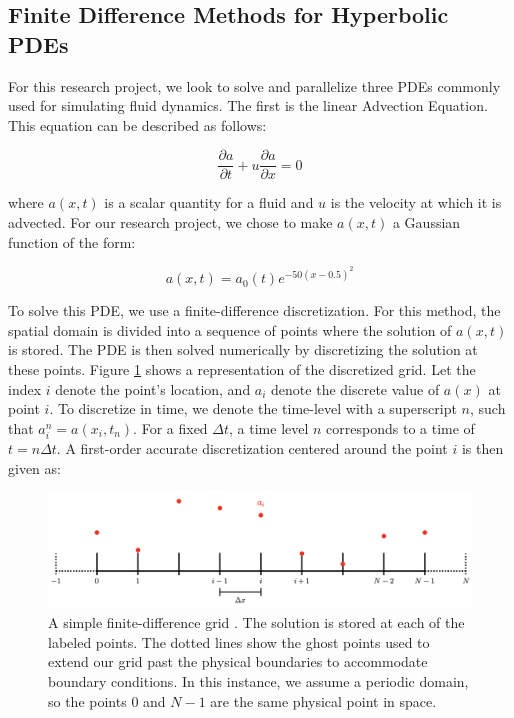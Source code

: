 \documentclass{article}
\begin{document}
\subsection{Finite Difference Methods for Hyperbolic PDEs}
For this research project, we look to solve and parallelize three PDEs commonly used for simulating fluid dynamics. The first is the linear Advection Equation. This equation can be described as follows: 

\begin{equation}
 \frac{\partial a}{\partial t} + u \frac{\partial a}{\partial x} = 0
\end{equation}

where $a(x,t)$ is a scalar quantity for a fluid and $u$ is the velocity at which it is advected. For our research project, we chose to make $a(x,t)$ a Gaussian function of the form: 

\begin{equation}
a(x,t) = a_0(t) e^{- 50 (x - 0.5)^2 }
\end{equation}

To solve this PDE, we use a finite-difference discretization. For this method, the spatial domain is divided into a sequence of points where the solution of $a(x,t)$ is stored. The PDE is then solved numerically by discretizing the solution at these points. Figure \ref{Finite_Difference_Grid} shows a representation of the discretized grid.
Let the index $i$ denote the point's location, and $a_i$ denote the discrete value of $a(x)$ at point $i$. To discretize in time, we denote the time-level with a superscript $n$, such that $a_i^n = a(x_i, t_n)$. For a fixed $\Delta t$, a time level $n$ corresponds to a time of $t = n \Delta t$. A first-order accurate discretization centered around the point $i$ is then given as:


\begin{figure}[b]
\centering
\includegraphics[width=1.0\textwidth]{Images/Finite_Difference_Grid.png}
\caption{A simple finite-difference grid \cite{zingale_2020}. The solution is stored at each of the labeled points. The dotted lines show the ghost points used to extend our grid past the physical boundaries to accommodate boundary conditions. In this instance, we assume a periodic domain, so the points $0$ and $N-1$ are the same physical point in space.}
\label{Finite_Difference_Grid}
\end{figure}
\end{document}
